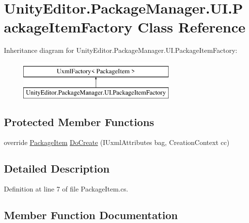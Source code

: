 \hypertarget{class_unity_editor_1_1_package_manager_1_1_u_i_1_1_package_item_factory}{}\section{Unity\+Editor.\+Package\+Manager.\+U\+I.\+Package\+Item\+Factory Class Reference}
\label{class_unity_editor_1_1_package_manager_1_1_u_i_1_1_package_item_factory}
Inheritance diagram for Unity\+Editor.\+Package\+Manager.\+U\+I.\+Package\+Item\+Factory\+:\begin{figure}[H]
\begin{center}
\leavevmode
\includegraphics[height=2.000000cm]{class_unity_editor_1_1_package_manager_1_1_u_i_1_1_package_item_factory}
\end{center}
\end{figure}
\subsection*{Protected Member Functions}
\begin{DoxyCompactItemize}
\item 
override \mbox{\hyperlink{class_unity_editor_1_1_package_manager_1_1_u_i_1_1_package_item}{Package\+Item}} \mbox{\hyperlink{class_unity_editor_1_1_package_manager_1_1_u_i_1_1_package_item_factory_ae34af00f4e21e5201c48bf274bfe89a9}{Do\+Create}} (I\+Uxml\+Attributes bag, Creation\+Context cc)
\end{DoxyCompactItemize}


\subsection{Detailed Description}


Definition at line 7 of file Package\+Item.\+cs.



\subsection{Member Function Documentation}
\mbox{\label{class_unity_editor_1_1_package_manager_1_1_u_i_1_1_package_item_factory_ae34af00f4e21e5201c48bf274bfe89a9}} 
